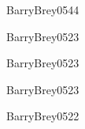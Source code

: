 \begin{syllabus}
\begin{unit}{\ARMultiprocessingDef}{BarryBrey05}{4}{4}
    \ARMultiprocessingAllTopics
    \ARMultiprocessingAllObjectives
\end{unit}

\begin{unit}{\ARPerformanceEnhancementsDef}{BarryBrey05}{2}{3}
    \ARPerformanceEnhancementsAllTopics
    \ARPerformanceEnhancementsAllObjectives
\end{unit}

\begin{unit}{\ARDistributedArchitecturesDef}{BarryBrey05}{2}{3}
    \ARDistributedArchitecturesAllTopics
    \ARDistributedArchitecturesAllObjectives
\end{unit}

\begin{unit}{\ARDevicesDef}{BarryBrey05}{2}{3}
    \ARDevicesAllTopics
    \ARDevicesAllObjectives
\end{unit}

\begin{unit}{\ARDirectionsInComputingDef}{BarryBrey05}{2}{2}
    \ARDirectionsInComputingAllTopics
    \ARDirectionsInComputingAllObjectives
\end{unit}



\begin{coursebibliography}
\end{coursebibliography}

\end{syllabus}
